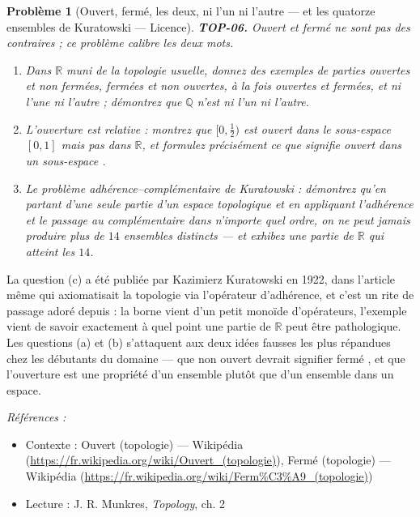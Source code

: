 \documentclass[11pt]{article}
\newtheorem{problem}{Problème}
\newenvironment{refs}{\par\small\noindent\emph{Références :}\begin{itemize}\setlength\itemsep{0pt}}{\end{itemize}\normalsize}
\begin{document}
\bigskip

\begin{problem}[{Ouvert, fermé, les deux, ni l'un ni l'autre --- et les quatorze ensembles de Kuratowski --- Licence}]
\textbf{TOP-06.} \og{} Ouvert \fg{} et \og{} fermé \fg{} ne sont pas des contraires ; ce problème calibre les deux
mots.
\begin{enumerate}
\item[(a)] Dans $\mathbb{R}$ muni de la topologie usuelle, donnez des exemples de parties ouvertes et non fermées,
fermées et non ouvertes, à la fois ouvertes et fermées, et ni l'une ni l'autre ; démontrez que $\mathbb{Q}$ n'est
ni l'un ni l'autre.
\item[(b)] L'ouverture est relative : montrez que $ [0, \tfrac12) $ est ouvert dans le sous-espace
$ [0,1] $ mais pas dans $\mathbb{R}$, et formulez précisément ce que signifie \og{} ouvert dans un
sous-espace \fg{}.
\item[(c)] Le problème adhérence--complémentaire de Kuratowski : démontrez qu'en partant d'une seule partie
d'un espace topologique et en appliquant l'adhérence et le passage au complémentaire dans n'importe
quel ordre, on ne peut jamais produire plus de $ 14 $ ensembles distincts --- et exhibez une partie de
$\mathbb{R}$ qui atteint les $ 14 $.
\end{enumerate}

\end{problem}

\noindent La question (c) a été publiée par Kazimierz Kuratowski en 1922, dans l'article même
qui axiomatisait la topologie via l'opérateur d'adhérence, et c'est un rite de passage adoré depuis : la
borne vient d'un petit monoïde d'opérateurs, l'exemple vient de savoir exactement à quel point une partie
de $\mathbb{R}$ peut être pathologique. Les questions (a) et (b) s'attaquent aux deux idées fausses les plus
répandues chez les débutants du domaine --- que \og{} non ouvert \fg{} devrait signifier \og{} fermé \fg{}, et que
l'ouverture est une propriété d'un ensemble plutôt que d'un ensemble dans un espace.

\begin{refs}
\item Contexte : Ouvert (topologie) --- Wikipédia (\url{https://fr.wikipedia.org/wiki/Ouvert_(topologie)}), Fermé (topologie) --- Wikipédia (\url{https://fr.wikipedia.org/wiki/Ferm%C3%A9_(topologie)})
\item Lecture : J. R. Munkres, \textit{Topology}, ch. 2
\end{refs}
\end{document}
